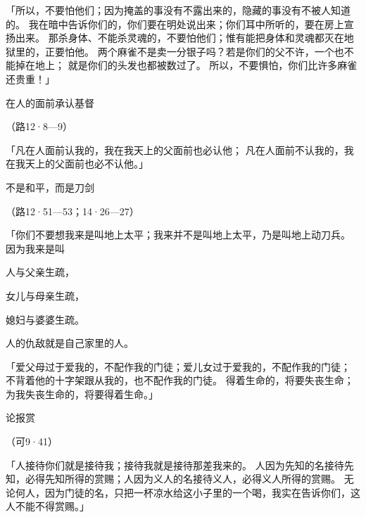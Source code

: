 {\par }{\PP {}「所以，不要怕他们；因为掩盖的事没有不露出来的，隐藏的事没有不被人知道的。
我在暗中告诉你们的，你们要在明处说出来；你们耳中所听的，要在房上宣扬出来。
那杀身体、不能杀灵魂的，不要怕他们；惟有能把身体和灵魂都灭在地狱里的，正要怕他。
两个麻雀不是卖一分银子吗？若是你们的父不许，一个也不能掉在地上；
就是你们的头发也都被数过了。
所以，不要惧怕，你们比许多麻雀还贵重！」
\par }{\SH 在人的面前承认基督
\par }{\R （路12·8—9）
\par }{\PP {}「凡在人面前认我的，我在我天上的父面前也必认他；
凡在人面前不认我的，我在我天上的父面前也必不认他。」
\par }{\SH 不是和平，而是刀剑
\par }{\R （路12·51—53；14·26—27）
\par }{\PP {}「你们不要想我来是叫地上太平；我来并不是叫地上太平，乃是叫地上动刀兵。
因为我来是叫
\par }{\Q 人与父亲生疏，
\par }{\Q 女儿与母亲生疏，
\par }{\Q 媳妇与婆婆生疏。
\par }{\Q {}人的仇敌就是自己家里的人。
\par }{\PP {}「爱父母过于爱我的，不配作我的门徒；爱儿女过于爱我的，不配作我的门徒；
不背着他的十字架跟从我的，也不配作我的门徒。
得着生命的，将要失丧生命；为我失丧生命的，将要得着生命。」
\par }{\SH 论报赏
\par }{\R （可9·41）
\par }{\PP {}「人接待你们就是接待我；接待我就是接待那差我来的。
人因为先知的名接待先知，必得先知所得的赏赐；人因为义人的名接待义人，必得义人所得的赏赐。
无论何人，因为门徒的名，只把一杯凉水给这小子里的一个喝，我实在告诉你们，这人不能不得赏赐。」

}
